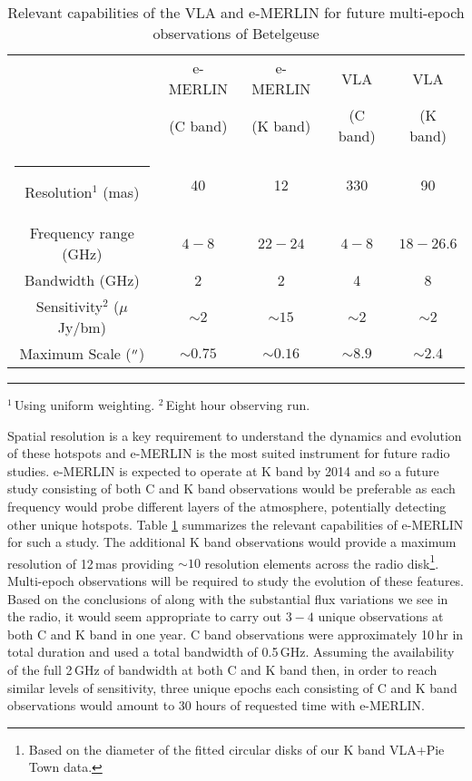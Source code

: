 \begin{table}[hb]
\begin{center}
\caption[]{Relevant capabilities of the VLA and e-MERLIN for future multi-epoch observations of Betelgeuse}
\begin{tabular}{ccccc}
\hline
\hline
\rule{0pt}{2.5ex}  & e-MERLIN  & e-MERLIN & VLA  & VLA \\
\rule{0pt}{2.5ex}  & (C band) & (K band) & (C band) & (K band)\\
\hline
\rule{-2.5pt}{2.5ex}	Resolution$^{1}$ (mas) &  40 & 12 & 330&90\\
					Frequency range (GHz) &  $4-8$ & $22-24$ & $4-8$&$18-26.6$\\
					Bandwidth (GHz) &  2& 2 & 4&8\\
					Sensitivity$^{2}$ ($\mu$ Jy/bm) & $\sim 2$ & $\sim 15$&$\sim 2$&$\sim 2$\\
					Maximum Scale ($^{\prime\prime}$) & $\sim 0.75$ & $\sim 0.16$&$\sim 8.9$&$\sim 2.4$\\
\hline
\end{tabular}
\label{tab:8.1}
\begin{minipage}{12.5cm}
\rule{-2.5pt}{2.5ex}{\footnotesize $^{1}$\,Using uniform weighting. $^{2}$\,Eight hour observing run.}
\end{minipage}
\end{center}
\end{table}

Spatial resolution is a key requirement to understand the dynamics and evolution of these hotspots and e-MERLIN is the most suited instrument for future radio studies. e-MERLIN is expected to operate at K band by 2014 and so a future study consisting of both C and K band observations would be preferable as each frequency would probe different layers of the atmosphere, potentially detecting other unique hotspots. Table \ref{tab:8.1} summarizes the relevant capabilities of e-MERLIN for such a study. The additional K band observations would provide a maximum resolution of 12\,mas providing $\sim 10$ resolution elements across the radio disk\footnote{Based on the diameter of the fitted circular disks of our K band VLA+Pie Town data.}. Multi-epoch observations will be required to study the evolution of these features. Based on the conclusions of \cite{ohnaka_2011} along with the substantial flux variations we see in the radio, it would seem appropriate to carry out $3-4$ unique observations at both C and K band in one year. \cite{richards_2013}  C band observations were approximately 10\,hr in total duration and used a total bandwidth of 0.5\,GHz. Assuming the availability of the full 2\,GHz of bandwidth at both C and K band then, in order to reach similar levels of sensitivity, three unique epochs each consisting of C and K band observations would amount to 30 hours of requested time with e-MERLIN.

